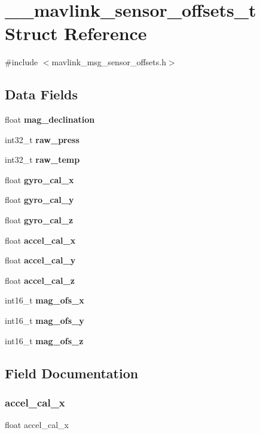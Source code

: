 \section{\+\_\+\+\_\+mavlink\+\_\+sensor\+\_\+offsets\+\_\+t Struct Reference}
\label{struct____mavlink__sensor__offsets__t}


{\ttfamily \#include $<$mavlink\+\_\+msg\+\_\+sensor\+\_\+offsets.\+h$>$}

\subsection*{Data Fields}
\begin{DoxyCompactItemize}
\item 
float \textbf{ mag\+\_\+declination}
\item 
int32\+\_\+t \textbf{ raw\+\_\+press}
\item 
int32\+\_\+t \textbf{ raw\+\_\+temp}
\item 
float \textbf{ gyro\+\_\+cal\+\_\+x}
\item 
float \textbf{ gyro\+\_\+cal\+\_\+y}
\item 
float \textbf{ gyro\+\_\+cal\+\_\+z}
\item 
float \textbf{ accel\+\_\+cal\+\_\+x}
\item 
float \textbf{ accel\+\_\+cal\+\_\+y}
\item 
float \textbf{ accel\+\_\+cal\+\_\+z}
\item 
int16\+\_\+t \textbf{ mag\+\_\+ofs\+\_\+x}
\item 
int16\+\_\+t \textbf{ mag\+\_\+ofs\+\_\+y}
\item 
int16\+\_\+t \textbf{ mag\+\_\+ofs\+\_\+z}
\end{DoxyCompactItemize}


\subsection{Field Documentation}
\mbox{\label{struct____mavlink__sensor__offsets__t_a07918c9f0c019bb437ff752940967b7f}} 
\subsubsection{accel\+\_\+cal\+\_\+x}
{\footnotesize\ttfamily float accel\+\_\+cal\+\_\+x}

